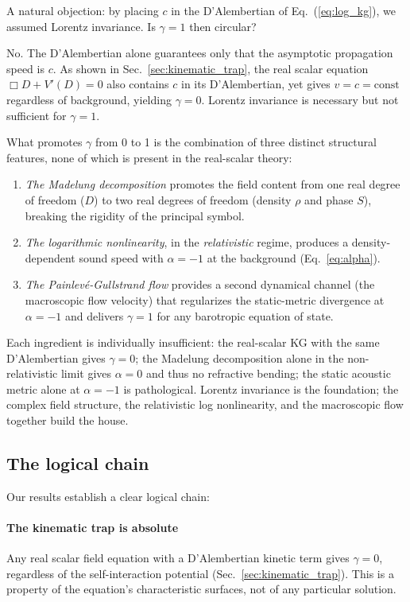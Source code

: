\documentclass[12pt, a4paper]{article}
\begin{document}
A natural objection: by placing $c$ in the D'Alembertian of Eq.~(\ref{eq:log_kg}), we assumed Lorentz invariance. Is $\gamma = 1$ then circular?

No. The D'Alembertian alone guarantees only that the
asymptotic propagation speed is $c$. As shown in
Sec.~\ref{sec:kinematic_trap}, the real scalar equation
$\Box D + V'(D) = 0$ also contains $c$ in its
D'Alembertian, yet gives $v = c = \mathrm{const}$
regardless of background, yielding $\gamma = 0$.
Lorentz invariance is necessary but not sufficient
for $\gamma = 1$.

What promotes $\gamma$ from 0 to 1 is the combination of three distinct structural features, none of which is present in the real-scalar theory:
\begin{enumerate}
\item \emph{The Madelung decomposition} promotes the field content from one real degree of freedom ($D$) to two real degrees of freedom (density $\rho$ and phase $S$), breaking the rigidity of the principal symbol.
\item \emph{The logarithmic nonlinearity}, in the \emph{relativistic} regime, produces a density-dependent sound speed with $\alpha = -1$ at the background (Eq.~\ref{eq:alpha}).
\item \emph{The Painlev\'{e}-Gullstrand flow} provides a second dynamical channel (the macroscopic flow velocity) that regularizes the static-metric divergence at $\alpha = -1$ and delivers $\gamma = 1$ for any barotropic equation of state.
\end{enumerate}
Each ingredient is individually insufficient: the real-scalar KG with the same D'Alembertian gives $\gamma = 0$; the Madelung decomposition alone in the non-relativistic limit gives $\alpha = 0$ and thus no refractive bending; the static acoustic metric alone at $\alpha = -1$ is pathological. Lorentz invariance is the foundation; the complex field structure, the relativistic log nonlinearity, and the macroscopic flow together build the house.

\subsection{The logical chain}
\label{subsec:logchain}
Our results establish a clear logical chain:

\paragraph{The kinematic trap is absolute}
Any real scalar field equation with a D'Alembertian kinetic term gives $\gamma = 0$, regardless of the self-interaction potential (Sec.~\ref{sec:kinematic_trap}). This is a property of the equation's characteristic surfaces, not of any particular solution.
\end{document}
